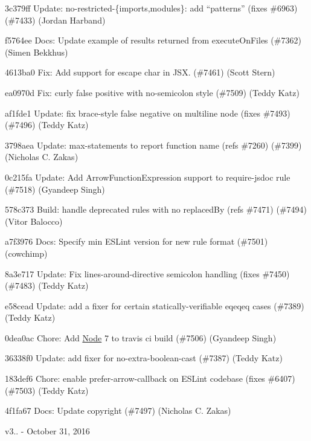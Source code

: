 \begin{DoxyItemize}
\item 3c379ff Update\+: {\ttfamily no-\/restricted-\/\{imports,modules\}}\+: add “patterns” (fixes \#6963) (\#7433) (Jordan Harband)
\item f5764ee Docs\+: Update example of results returned from {\ttfamily execute\+On\+Files} (\#7362) (Simen Bekkhus)
\item 4613ba0 Fix\+: Add support for escape char in J\+SX. (\#7461) (Scott Stern)
\item ea0970d Fix\+: {\ttfamily curly} false positive with no-\/semicolon style (\#7509) (Teddy Katz)
\item af1fde1 Update\+: fix {\ttfamily brace-\/style} false negative on multiline node (fixes \#7493) (\#7496) (Teddy Katz)
\item 3798aea Update\+: max-\/statements to report function name (refs \#7260) (\#7399) (Nicholas C. Zakas)
\item 0c215fa Update\+: Add {\ttfamily Arrow\+Function\+Expression} support to {\ttfamily require-\/jsdoc} rule (\#7518) (Gyandeep Singh)
\item 578c373 Build\+: handle deprecated rules with no \textquotesingle{}replaced\+By\textquotesingle{} (refs \#7471) (\#7494) (Vitor Balocco)
\item a7f3976 Docs\+: Specify min E\+S\+Lint version for new rule format (\#7501) (cowchimp)
\item 8a3e717 Update\+: Fix {\ttfamily lines-\/around-\/directive} semicolon handling (fixes \#7450) (\#7483) (Teddy Katz)
\item e58cead Update\+: add a fixer for certain statically-\/verifiable {\ttfamily eqeqeq} cases (\#7389) (Teddy Katz)
\item 0dea0ac Chore\+: Add \mbox{\hyperlink{class_node}{Node}} 7 to travis ci build (\#7506) (Gyandeep Singh)
\item 36338f0 Update\+: add fixer for {\ttfamily no-\/extra-\/boolean-\/cast} (\#7387) (Teddy Katz)
\item 183def6 Chore\+: enable {\ttfamily prefer-\/arrow-\/callback} on E\+S\+Lint codebase (fixes \#6407) (\#7503) (Teddy Katz)
\item 4f1fa67 Docs\+: Update copyright (\#7497) (Nicholas C. Zakas)
\end{DoxyItemize}

v3.. -\/ October 31, 2016


